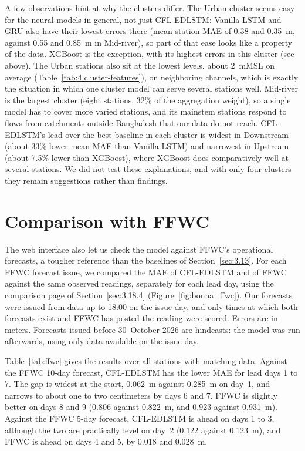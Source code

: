 A few observations hint at why the clusters differ. The Urban cluster seems easy
for the neural models in general, not just CFL-EDLSTM: Vanilla LSTM and GRU also
have their lowest errors there (mean station MAE of 0.38 and 0.35~m, against 0.55
and 0.85~m in Mid-river), so part of that ease looks like a property of the data.
XGBoost is the exception, with its highest errors in this cluster
(see above). The Urban stations also sit at the lowest levels, about
2~mMSL on average (Table~\ref{tab:4.cluster-features}), on neighboring channels,
which is exactly the situation in which one cluster model can serve several
stations well. Mid-river is the largest cluster (eight stations, 32\% of the
aggregation weight), so a single model has to cover more varied stations, and its
mainstem stations respond to flows from catchments outside Bangladesh that our
data do not reach. CFL-EDLSTM's lead over the best baseline in each cluster is
widest in Downstream (about 33\% lower mean MAE than Vanilla LSTM) and narrowest
in Upstream (about 7.5\% lower than XGBoost), where XGBoost does comparatively well
at several stations. We did not test these explanations, and with only four
clusters they remain suggestions rather than findings.

\section{Comparison with FFWC}
\label{sec:4.11}
\label{sec:ffwc_comparison}

The web interface also let us check the model against FFWC's operational
forecasts, a tougher reference than the baselines of Section~\ref{sec:3.13}. For
each FFWC forecast issue, we compared the MAE of CFL-EDLSTM and of FFWC against
the same observed readings, separately for each lead day, using the comparison
page of Section~\ref{sec:3.18.4} (Figure~\ref{fig:bonna_ffwc}). Our forecasts
were issued from data up to 18:00 on the issue day, and only times at which both
forecasts exist and FFWC has posted the reading were scored. Errors are in
meters. Forecasts issued before 30~October 2026 are hindcasts: the model was run
afterwards, using only data available on the issue day.

Table~\ref{tab:ffwc} gives the results over all stations with matching data.
Against the FFWC 10-day forecast, CFL-EDLSTM has the lower MAE for lead days 1 to
7. The gap is widest at the start, 0.062~m against 0.285~m on day~1, and narrows
to about one to two centimeters by days 6 and 7. FFWC is slightly better on days
8 and 9 (0.806 against 0.822~m, and 0.923 against 0.931~m). Against the FFWC
5-day forecast, CFL-EDLSTM is ahead on days 1 to 3, although the two are
practically level on day~2 (0.122 against 0.123~m), and FFWC is ahead on days 4
and 5, by 0.018 and 0.028~m.

